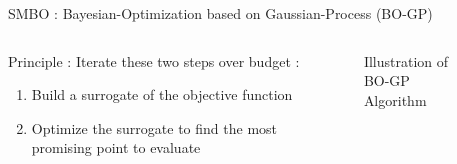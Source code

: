 

\begin{frame}{SMBO : Bayesian-Optimization based on Gaussian-Process (BO-GP)}
    \begin{columns}
        \begin{column}{0.4\textwidth}

            \begin{block}{Principle :}
                Iterate these two steps over budget : 
                \begin{enumerate}
                    \item Build a surrogate of the objective function
                    \item Optimize the surrogate to find the most promising point to evaluate
                \end{enumerate}
                
                
            \end{block}
            
        \end{column}        
        \begin{column}{0.5\textwidth}
            \begin{figure}
                \centering
                
                \caption{Illustration of BO-GP Algorithm}
            \end{figure}
        \end{column}
    \end{columns}
    
\end{frame}

